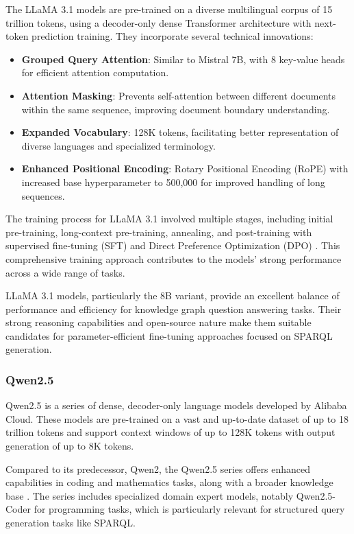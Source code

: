 The LLaMA 3.1 models are pre-trained on a diverse multilingual corpus of 15 trillion tokens, using a decoder-only dense Transformer architecture with next-token prediction training. They incorporate several technical innovations:

\begin{itemize}
    \item \textbf{Grouped Query Attention}: Similar to Mistral 7B, with 8 key-value heads for efficient attention computation.
    \item \textbf{Attention Masking}: Prevents self-attention between different documents within the same sequence, improving document boundary understanding.
    \item \textbf{Expanded Vocabulary}: 128K tokens, facilitating better representation of diverse languages and specialized terminology.
    \item \textbf{Enhanced Positional Encoding}: Rotary Positional Encoding (RoPE) \citep{su2024} with increased base hyperparameter to 500,000 for improved handling of long sequences.
\end{itemize}

The training process for LLaMA 3.1 involved multiple stages, including initial pre-training, long-context pre-training, annealing, and post-training with supervised fine-tuning (SFT) and Direct Preference Optimization (DPO) \citep{rafailov2024}. This comprehensive training approach contributes to the models' strong performance across a wide range of tasks.

LLaMA 3.1 models, particularly the 8B variant, provide an excellent balance of performance and efficiency for knowledge graph question answering tasks. Their strong reasoning capabilities and open-source nature make them suitable candidates for parameter-efficient fine-tuning approaches focused on SPARQL generation.

\subsubsection{Qwen2.5}
Qwen2.5 is a series of dense, decoder-only language models developed by Alibaba Cloud. These models are pre-trained on a vast and up-to-date dataset of up to 18 trillion tokens and support context windows of up to 128K tokens with output generation of up to 8K tokens.

Compared to its predecessor, Qwen2, the Qwen2.5 series offers enhanced capabilities in coding and mathematics tasks, along with a broader knowledge base \citep{qwen25}. The series includes specialized domain expert models, notably Qwen2.5-Coder for programming tasks, which is particularly relevant for structured query generation tasks like SPARQL.

